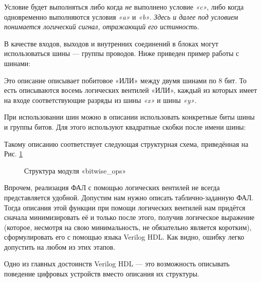 \documentclass[a5paper, DIV=14, headings=openany, twoside=true,fontsize=10pt, titlepage]{scrreprt}
\newcommand{\quotes}[1]{«#1»}
\newcommand{\eng}[1]{\foreignlanguage{english}{#1}}
\newcommand{\qeng}[1]{\quotes{\eng{#1}}}
\begin{document}
\par{Условие будет выполняться либо когда \emph{не} выполнено условие \emph{\qeng{c}}, либо когда одновременно выполняются условия \emph{\qeng{a}} и \emph{\qeng{b}}. \emph{Здесь и далее под условием понимается логический сигнал, отражающий его истинность.}}
\par{В качестве входов, выходов и внутренних соединений в блоках могут использоваться шины — группы проводов. Ниже приведен пример работы с шинами:}



\par{Это описание описывает побитовое \quotes{ИЛИ} между двумя шинами по 8 бит. То есть описываются восемь логических вентилей \quotes{ИЛИ}, каждый из которых имеет на входе соответствующие разряды из шины \emph{\qeng{x}} и шины \emph{\qeng{y}}.}

\par{При использовании шин можно в описании использовать конкретные биты шины и группы битов. Для этого используют квадратные скобки после имени шины:}



\par{Такому описанию соответствует следующая структурная схема, приведённая на Рис. \ref{fig:bitwiseops}}

\begin{figure}[H]
  \centering
  \def\svgwidth{\columnwidth}
  
  \caption{Структура модуля \qeng{bitwise\_ops}}
  \label{fig:bitwiseops}
\end{figure}

\par{Впрочем, реализация ФАЛ с помощью логических вентилей не всегда представляется удобной. Допустим нам нужно описать таблично-заданную ФАЛ. Тогда описания этой функции при помощи логических вентилей нам придётся сначала минимизировать её и только после этого, получив логическое выражение (которое, несмотря на свою минимальность, не обязательно является коротким), сформулировать его с помощью языка \eng{Verilog HDL}. Как видно, ошибку легко допустить на любом из этих этапов.}

\par{Одно из главных достоинств \eng{Verilog HDL} — это возможность описывать поведение цифровых устройств вместо описания их структуры.}
\end{document}
